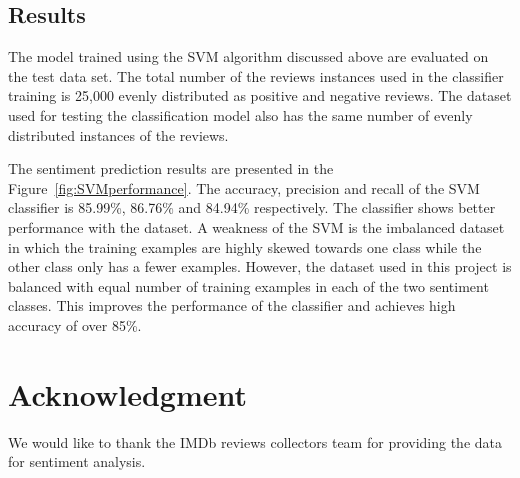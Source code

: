 \documentclass[conference]{IEEEtran}
\begin{document}
    
\subsection{Results}

The model trained using the SVM algorithm discussed above are evaluated on the test data set.
The total number of the reviews instances used in the classifier training is 25,000 evenly distributed as
positive and negative reviews. The dataset used for testing the classification model also has the same
number of evenly distributed instances of the reviews.

The sentiment prediction results are presented in the Figure~\ref{fig:SVMperformance}. The accuracy, precision and recall of the SVM classifier is 85.99\%, 86.76\% and 84.94\% respectively. The classifier shows better performance with the dataset. A weakness of the SVM is the imbalanced dataset in which the training examples are highly skewed towards one class while the other class only has a fewer examples. However, the dataset used in this project is balanced with equal number of training examples in each of the two sentiment classes. This improves the performance of the classifier and achieves high accuracy of over 85\%.




\section*{Acknowledgment}
We would like to thank the IMDb reviews collectors team for providing the data for sentiment analysis.




%
%
%
\end{document}
